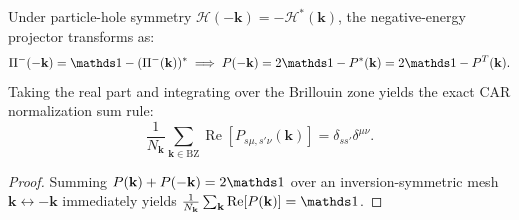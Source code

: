 \begin{proposition}
\label{prop:m1_3_car_sum_rule}
Under particle-hole symmetry $\mathcal{H}(-\mathbf{k}) = -\mathcal{H}^*(\mathbf{k})$, the negative-energy projector transforms as:
\begin{equation}
\label{eq:m1_3_projector_phs}
\Pi^-(-\mathbf{k}) = \Id - (\Pi^-(\mathbf{k}))^* \implies P(-\mathbf{k}) = 2\Id - P^*(\mathbf{k}) = 2\Id - P^T(\mathbf{k}).
\end{equation}
Taking the real part and integrating over the Brillouin zone yields the exact CAR normalization sum rule:
\begin{equation}
\label{eq:m1_3_car_sum_rule}
\frac{1}{N_{\mathbf{k}}} \sum_{\mathbf{k} \in \mathrm{BZ}} \operatorname{Re}\left[ P_{s\mu, s'\nu}(\mathbf{k}) \right] = \delta_{ss'} \delta^{\mu\nu}.
\end{equation}
\end{proposition}
\begin{proof}
Summing $P(\mathbf{k}) + P(-\mathbf{k}) = 2\Id$ over an inversion-symmetric mesh $\mathbf{k} \leftrightarrow -\mathbf{k}$ immediately yields $\frac{1}{N_{\mathbf{k}}} \sum_{\mathbf{k}} \operatorname{Re}[P(\mathbf{k})] = \Id$.
\end{proof}

